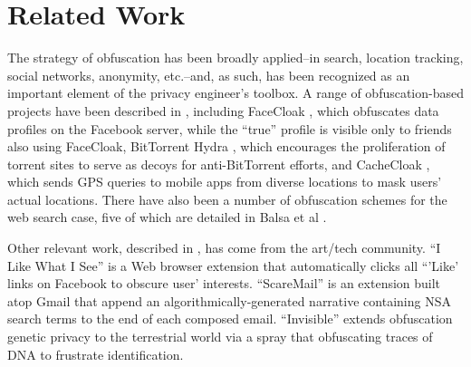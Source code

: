 \documentclass[conference]{IEEEtran}
\begin{document}
\section{Related Work}

The strategy of obfuscation has been broadly applied--in search\cite{Howe-2}, location tracking\cite{Meyerowitz}, social networks\cite{Luo}, anonymity\cite{Chakravarty, Schulze}, etc.--and, as such, has been recognized as an important element of the privacy engineer's toolbox. A range of obfuscation-based projects have been described in \cite{Brunton}, including FaceCloak \cite{Luo}, which obfuscates data profiles on the Facebook server, while the “true” profile is visible only to friends also using FaceCloak,  BitTorrent Hydra \cite{Schulze}, which encourages the proliferation of torrent sites to serve as decoys for anti-BitTorrent efforts, and CacheCloak \cite{Meyerowitz}, which sends GPS queries to mobile apps from diverse locations to mask users' actual locations. There have also been a number of obfuscation schemes for the web search case, five of which are detailed in Balsa et al \cite{Balsa}.

Other relevant work, described in \cite{Howe-3}, has come from the art/tech community. “I Like What I See” is a Web browser extension that automatically clicks all “'Like' links on Facebook to obscure user' interests. “ScareMail” \cite{Grosser} is an extension built atop Gmail that append an algorithmically-generated narrative containing NSA search terms to the end of each composed email. “Invisible” extends obfuscation genetic privacy to the terrestrial world via a spray that obfuscating traces of DNA to frustrate identification.
\end{document}

